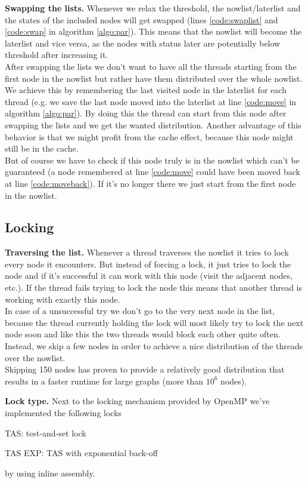 \documentclass[letterpaper]{article}
\newcommand{\mypar}[1]{{\bf #1.}}
\begin{document}
\mypar{Swapping the lists}
Whenever we relax the threshold, the nowlist/laterlist and the states of the included nodes will get swapped (lines \ref{code:swaplist} and \ref{code:swap} in algorithm \ref{algo:par}). This means that the nowlist will become the laterlist and vice versa, as the nodes with status later are potentially below threshold after increasing it.\\
After swapping the lists  we don't want to have all the threads starting from the first node in the nowlist but rather have them distributed over the whole nowlist. We achieve this by remembering the last visited node in the laterlist for each thread (e.g. we save the last node moved into the laterlist at line \ref{code:move} in algorithm \ref{algo:par}). By doing this the thread can start from this node after swapping the lists and we get the wanted distribution. Another advantage of this behavior is that we might profit from the cache effect, because this node might still be in the cache.\\
But of course we have to check if this node truly is in the nowlist which can't be guaranteed (a node remembered at line \ref{code:move} could have been moved back at line \ref{code:moveback}). If it's no longer there we just start from the first node in the nowlist.

\subsection{Locking}\label{ssec:lock}

\mypar{Traversing the list}
Whenever a thread traverses the nowlist it tries to lock every node it encounters. But instead of forcing a lock, it just tries to lock the node and if it's successful it can work with this node (visit the adjacent nodes, etc.). If the thread fails trying to lock the node this means that another thread is working with exactly this node.\\
In case of a unsuccessful try we don't go to the very next node in the list, because the thread currently holding the lock will most likely try to lock the next node soon and like this the two threads would block each other quite often. Instead, we skip a few nodes in order to achieve a nice distribution of the threads over the nowlist.\\
Skipping 150 nodes has proven to provide a relatively good distribution that results in a faster runtime for large graphs (more than $10^6$ nodes).

\mypar{Lock type}
Next to the locking mechanism provided by OpenMP we've implemented the following locks
\begin{compactitem}
\item TAS: test-and-set lock
\item TAS EXP: TAS with exponential back-off
\end{compactitem}
by using inline assembly.
\end{document}
